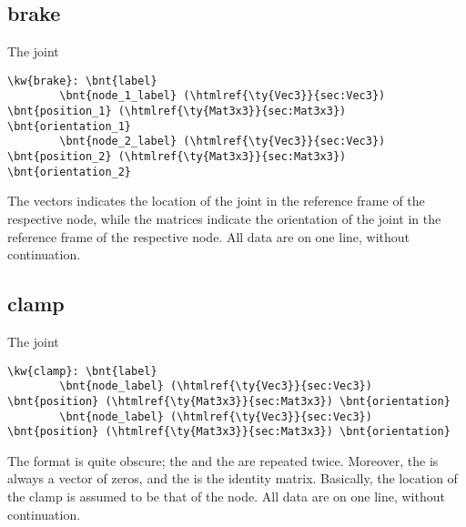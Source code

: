 \subsection{brake}
The  joint
\begin{Verbatim}[commandchars=\\\{\}]
    \kw{brake}: \bnt{label}
        \bnt{node_1_label} (\htmlref{\ty{Vec3}}{sec:Vec3}) \bnt{position_1} (\htmlref{\ty{Mat3x3}}{sec:Mat3x3}) \bnt{orientation_1}
        \bnt{node_2_label} (\htmlref{\ty{Vec3}}{sec:Vec3}) \bnt{position_2} (\htmlref{\ty{Mat3x3}}{sec:Mat3x3}) \bnt{orientation_2}
\end{Verbatim}
The  vectors indicates the location of the joint
in the reference frame of the respective node,
while the  matrices indicate the orientation of the joint
in the reference frame of the respective node.
All data are on one line, without continuation.

\subsection{clamp}
The  joint
\begin{Verbatim}[commandchars=\\\{\}]
    \kw{clamp}: \bnt{label}
        \bnt{node_label} (\htmlref{\ty{Vec3}}{sec:Vec3}) \bnt{position} (\htmlref{\ty{Mat3x3}}{sec:Mat3x3}) \bnt{orientation}
        \bnt{node_label} (\htmlref{\ty{Vec3}}{sec:Vec3}) \bnt{position} (\htmlref{\ty{Mat3x3}}{sec:Mat3x3}) \bnt{orientation}
\end{Verbatim}
The format is quite obscure; the  and the 
are repeated twice.
Moreover, the  is always a vector of zeros,
and the  is the identity matrix.
Basically, the location of the clamp is assumed to be that of the node.
All data are on one line, without continuation.

